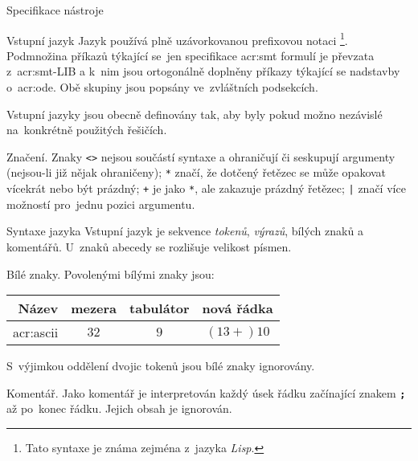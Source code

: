 \documentclass[thesis=M,czech]{FITthesis}[2012/06/26]
\newcommand{\acrlabel}[1]{acr:#1}
\newcommand{\acr}[1]{\acrshort{\acrlabel{#1}}}
\newcommand{\id}[1]{\texttt{#1}}
\newcommand{\hl}[1]{\textit{#1}}
\newcommand{\hll}[1]{\textbf{#1}}
\newcommand{\name}[1]{\hl{#1}}
\begin{document}
\begin{section}{Specifikace nástroje}
\begin{subsection}{Vstupní jazyk}
Jazyk používá plně uzávorkovanou prefixovou notaci%
\footnote{Tato syntaxe je známa zejména z~jazyka \name{Lisp}.}.
Podmnožina příkazů týkající se~jen specifikace \acr{smt} formulí
je převzata z~\acr{smt}-LIB
a k~nim jsou ortogonálně doplněny
příkazy týkající se nadstavby o~\acr{ode}.
Obě skupiny jsou popsány ve~zvláštních podsekcích.

Vstupní jazyky jsou obecně definovány tak,
aby byly pokud možno nezávislé na~konkrétně použitých řešičích.


\begin{paragraph}{Značení.}\label{ss:design:spec:ilang:sign}
Znaky \id{<>} nejsou součástí syntaxe a ohraničují či seskupují argumenty
(nejsou-li již nějak ohraničeny);
\id{*} značí, že dotčený řetězec
se může opakovat vícekrát nebo být prázdný;
\id{+} je jako \id{*}, ale zakazuje prázdný řetězec;
\id{|} značí více možností pro~jednu pozici argumentu.
\end{paragraph} %



\begin{subsubsection}{Syntaxe jazyka}\label{sss:design:spec:ilang:syntax}
Vstupní jazyk je sekvence \name{tokenů}, \name{výrazů},
bílých znaků a komentářů.
U~znaků abecedy se rozlišuje velikost písmen.


\begin{paragraph}{Bílé znaky.}\label{p:design:spec:ilang:struct:ws}
Povolenými bílými znaky jsou:
\begin{center}
\begin{tabular}{r|ccc}
   Název       & mezera & tabulátor & nová řádka \\ \hline
   \acr{ascii} &   $32$ &       $9$ &  $(13+{})10$ \\
\end{tabular}
\end{center}

S~výjimkou oddělení dvojic tokenů jsou bílé znaky ignorovány.
\end{paragraph} %


\begin{paragraph}{Komentář.}\label{p:design:spec:ilang:struct:cmt}
Jako komentář je interpretován každý úsek řádku
začínající znakem \hll{\id{;}} až po~konec řádku.
Jejich obsah je ignorován.
\end{paragraph} %


\end{subsubsection}
\end{subsection}
\end{section}
\end{document}
